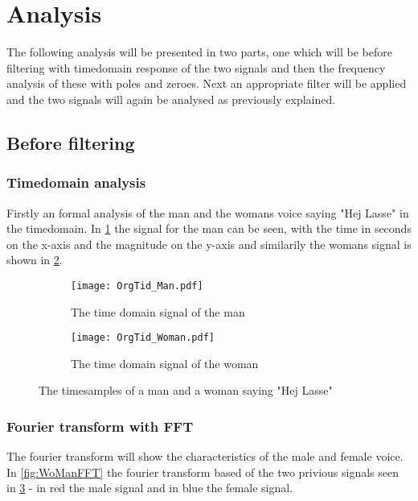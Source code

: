 
\section{Analysis}

The following analysis will be presented in two parts, one which will be before filtering with timedomain response of the two signals and then the frequency analysis of these with poles and zeroes. Next an appropriate filter will be applied and the two signals will again be analysed as previously explained.

\subsection{Before filtering}

\subsubsection{Timedomain analysis}

Firstly an formal analysis of the man and the womans voice saying "Hej Lasse" in the timedomain. In \cref{fig:time_man} the signal for the man can be seen, with the time in seconds on the x-axis and the magnitude on the y-axis and similarily the womans signal is shown in \cref{fig:time_woman}.

\begin{figure}
\centering
\begin{subfigure}{0.45\textwidth}
	\texttt{[image: OrgTid\_Man.pdf]}
	\caption{The time domain signal of the man}
	\label{fig:time_man}
\end{subfigure}
\quad
\begin{subfigure}{0.45\textwidth}
\texttt{[image: OrgTid\_Woman.pdf]}
\caption{The time domain signal of the woman}
\label{fig:time_woman}
\end{subfigure}
\caption{The timesamples of a man and a woman saying "Hej Lasse"}
\label{fig:time_WoMan}
\end{figure}

\subsubsection{Fourier transform with FFT}

The fourier transform will show the characteristics of the male and female voice. In \cref{fig:WoManFFT} the fourier transform based of the two privious signals seen in \cref{fig:time_WoMan} - in red the male signal and in blue the female signal.

